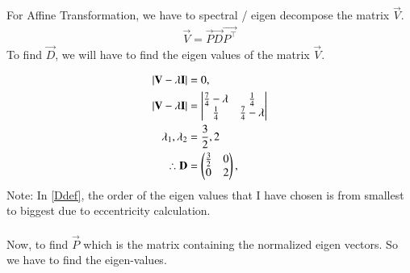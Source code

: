 \documentclass[journal]{IEEEtran}
\begin{document}
For Affine Transformation, we have to spectral / eigen decompose the matrix $\vec{V}$. \\ 

\begin{align}
	\vec{V} = \vec{P}\vec{D}\vec{P^\top}
\end{align}
To find $\vec{D}$, we will have to find the eigen values of the matrix $\vec{V}$.

	\begin{align}
		|\mathbf{V}  - \lambda\mathbf{I}|  &= 0,\\
		|\mathbf{V}  - \lambda\mathbf{I}|  &= \begin{vmatrix}\frac{7}{4} - \lambda& \frac{1}{4}\\ \frac{1}{4} & \frac{7}{4} - \lambda\end{vmatrix}\\
		\lambda_1, \lambda_2 &= \frac{3}{2} , 2\\
		\therefore 	\mathbf{D} &= \begin{pmatrix}\frac{3}{2} & 0 \\ 0 & 2	\end{pmatrix} , \label{Ddef}
	\end{align}
Note: In \eqref{Ddef}, the order of the eigen values that I have chosen is from smallest to biggest due to eccentricity calculation.\\
\\
Now, to find $\vec{P}$ which is the matrix containing the normalized eigen vectors. So we have to find the eigen-values.
\end{document}
